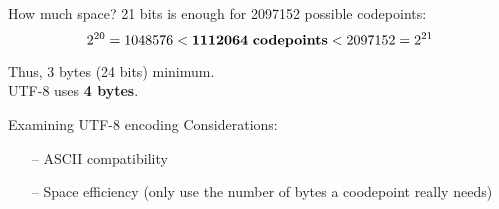 \documentclass[../index.tex]{subfiles}
\begin{document}
\renewcommand{\currenttitle}{How much space?}
\begin{frame}{\currenttitle}
%
%
  21 bits is enough for 2097152 possible codepoints:
  \[
    2^{20} = 1048576 < \boldsymbol{1112064} \text{ \textbf{codepoints}} < 2097152 = 2^{21}
  \]

  Thus, 3 bytes (24 bits) minimum. \\[1em]

  UTF-8 uses \textbf{4 bytes}.
\end{frame}

\renewcommand{\currenttitle}{Examining UTF-8 encoding}
\begin{frame}{\currenttitle}
%
%
%
%
  Considerations:

  \begin{itemize}
    \item[--] ASCII compatibility
    \item[--] Space efficiency (only use the number of bytes a coodepoint really needs)
  \end{itemize}
\end{frame}
\end{document}
